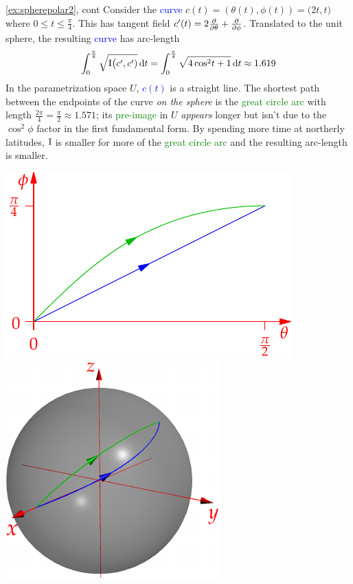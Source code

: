 \begin{example*}{\ref{ex:spherepolar2}, cont}{}\label{ex:spherepolar3}
Consider the \textcolor{blue}{curve} $c(t)=(\theta(t),\phi(t))=\bigl(2t,t\bigr)$ where $0\le t\le\frac\pi 4$. This has tangent field $c'(t)=2\frac{\partial }{\partial \theta}+\frac{\partial }{\partial \phi}$. Translated to the unit sphere, the resulting \textcolor{blue}{curve} has arc-length
\[\int_0^{\frac\pi 4}\sqrt{\mathrm{I}\bigl(c',c')}\,{\mathrm{d} t}=\int_0^{\frac\pi 4}\sqrt{4\cos^2\!t+1}\,{\mathrm{d} t}\approx 1.619\]
In the parametrization space $U$, \textcolor{blue}{$c(t)$} is a straight line. The shortest path between the endpoints of the curve \emph{on the sphere} is the \textcolor{Green}{great circle arc} with length $\frac{2\pi}4=\frac\pi 2\approx 1.571$; its \textcolor{Green}{pre-image} in $U$ \emph{appears} longer but isn't due to the $\cos^2\!\phi$ factor in the first fundamental form. By spending more time at northerly latitudes, $\mathrm{I}$ is smaller for more of the \textcolor{Green}{great circle arc} and the resulting arc-length is smaller.
	\begin{center}
		\includegraphics{fund-sphere4}\qquad\qquad
	\href{http://www.math.uci.edu/~ndonalds/math162a/fund-sphere3.html}{\includegraphics{fund-sphere3}}
	\end{center}
\end{example*}

